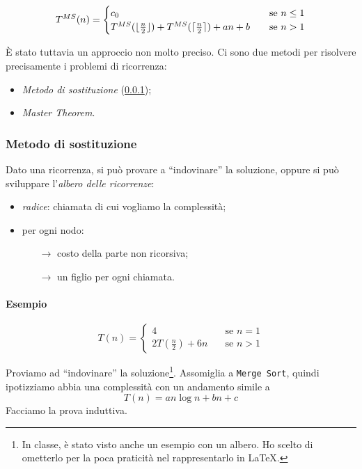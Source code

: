 \[ T^{MS}(n) =
\begin{cases}
c_0       & \quad \text{se } n \leq 1 \\
T^{MS}(\lfloor\frac{n}{2}\rfloor)+T^{MS}(\lceil\frac{n}{2}\rceil) + an + b  & \quad \text{se } n>1
\end{cases}
\]

È stato tuttavia un approccio non molto preciso. Ci sono due metodi per risolvere precisamente 
i problemi di ricorrenza:
\begin{itemize}[noitemsep]
	\item \emph{Metodo di sostituzione} (\ref{ricorrenze:sostituzione});
	\item \emph{Master Theorem}.
\end{itemize}

\subsubsection{Metodo di sostituzione} \label{ricorrenze:sostituzione}
Dato una ricorrenza, si può provare a ``indovinare'' la soluzione, oppure si può sviluppare l'\emph{albero %
delle ricorrenze}:
\begin{itemize}
	\item \emph{radice}: chiamata di cui vogliamo la complessità;
	\item per ogni nodo:
	\begin{itemize}
		\item[$\rightarrow$] costo della parte non ricorsiva;
		\item[$\rightarrow$] un figlio per ogni chiamata.
	\end{itemize}
\end{itemize}

\paragraph{Esempio} 

\[ T(n) =
\begin{cases}
4       & \quad \text{se } n = 1 \\
2T(\frac{n}{2})+ 6n  & \quad \text{se } n>1
\end{cases}
\]

Proviamo ad ``indovinare'' la soluzione\footnote{In classe, è stato visto anche un esempio con un albero. Ho scelto di ometterlo per la poca praticità nel rappresentarlo in \LaTeX.}. Assomiglia a \texttt{Merge Sort},
quindi ipotizziamo abbia una complessità con un andamento simile a 
\begin{displaymath}
	T(n) = an \log n + bn + c
\end{displaymath}
Facciamo la prova induttiva.

